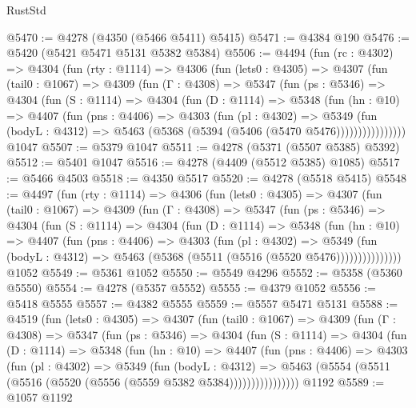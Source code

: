 \begin{lexlean}{RustStd}
\begin{coremodule}
@5470 := @4278 (@4350 (@5466 @5411) @5415)
@5471 := @4384 @190
@5476 := @5420 (@5421 @5471 @5131 @5382 @5384)
@5506 := @4494
    (fun (rc : @4302) =>
    @4304
      (fun (rty : @1114) =>
      @4306
        (fun (lets0 : @4305) =>
        @4307
          (fun (tail0 : @1067) =>
          @4309
            (fun (Γ : @4308) =>
            @5347
              (fun (ps : @5346) =>
              @4304
                (fun (S : @1114) =>
                @4304
                  (fun (D : @1114) =>
                  @5348
                    (fun (hn : @10) =>
                    @4407
                      (fun (pns : @4406) =>
                      @4303
                        (fun (pl : @4302) =>
                        @5349
                          (fun (bodyL : @4312) =>
                          @5463 (@5368 (@5394 (@5406 (@5470 @5476))))))))))))))))
    @1047
@5507 := @5379 @1047
@5511 := @4278 (@5371 (@5507 @5385) @5392)
@5512 := @5401 @1047
@5516 := @4278 (@4409 (@5512 @5385) @1085)
@5517 := @5466 @4503
@5518 := @4350 @5517
@5520 := @4278 (@5518 @5415)
@5548 := @4497
    (fun (rty : @1114) =>
    @4306
      (fun (lets0 : @4305) =>
      @4307
        (fun (tail0 : @1067) =>
        @4309
          (fun (Γ : @4308) =>
          @5347
            (fun (ps : @5346) =>
            @4304
              (fun (S : @1114) =>
              @4304
                (fun (D : @1114) =>
                @5348
                  (fun (hn : @10) =>
                  @4407
                    (fun (pns : @4406) =>
                    @4303
                      (fun (pl : @4302) =>
                      @5349
                        (fun (bodyL : @4312) =>
                        @5463 (@5368 (@5511 (@5516 (@5520 @5476)))))))))))))))
    @1052
@5549 := @5361 @1052
@5550 := @5549 @4296
@5552 := @5358 (@5360 @5550)
@5554 := @4278 (@5357 @5552)
@5555 := @4379 @1052
@5556 := @5418 @5555
@5557 := @4382 @5555
@5559 := @5557 @5471 @5131
@5588 := @4519
    (fun (lets0 : @4305) =>
    @4307
      (fun (tail0 : @1067) =>
      @4309
        (fun (Γ : @4308) =>
        @5347
          (fun (ps : @5346) =>
          @4304
            (fun (S : @1114) =>
            @4304
              (fun (D : @1114) =>
              @5348
                (fun (hn : @10) =>
                @4407
                  (fun (pns : @4406) =>
                  @4303
                    (fun (pl : @4302) =>
                    @5349
                      (fun (bodyL : @4312) =>
                      @5463 (@5554 (@5511 (@5516 (@5520 (@5556 (@5559 @5382 @5384))))))))))))))))
    @1192
@5589 := @1057 @1192

\end{coremodule}
\end{lexlean}
